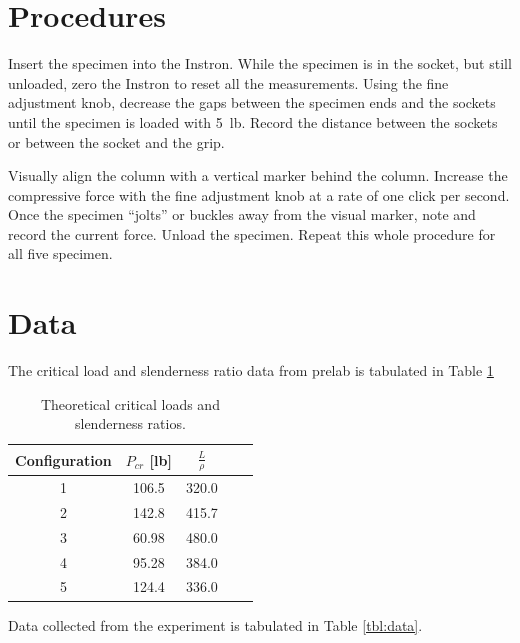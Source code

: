 \documentclass[12 pt]{article}
\begin{document}
\section{Procedures} \label{procedures}
Insert the specimen into the Instron. While the specimen is in the socket, but still unloaded, zero the Instron to reset all the measurements. Using the fine adjustment knob, decrease the gaps between the specimen ends and the sockets until the specimen is loaded with \qty{5}{lb}. Record the distance between the sockets or between the socket and the grip.

Visually align the column with a vertical marker behind the column. Increase the compressive force with the fine adjustment knob at a rate of one click per second. Once the specimen ``jolts'' or buckles away from the visual marker, note and record the current force. Unload the specimen. Repeat this whole procedure for all five specimen.

\section{Data} \label{data}
The critical load and slenderness ratio data from prelab is tabulated in Table \ref{tbl:prelab}

\begin{table}[!htbp]
\caption{Theoretical critical loads and slenderness ratios.}
\begin{center}
	\begin{tabular}{|c|c|c|c|c|}
		\hline
		Configuration&$P_{cr}$ [\unit{lb}]&$\frac{L}{\rho}$\\
		\hline
		\num{1}&\num{106.5}&\num{320.0}\\
		\hline
		\num{2}&\num{142.8}&\num{415.7}\\
		\hline
		\num{3}&\num{60.98}&\num{480.0}\\
		\hline
		\num{4}&\num{95.28}&\num{384.0}\\
		\hline
		\num{5}&\num{124.4}&\num{336.0}\\
		\hline
	\end{tabular}
\end{center}
\label{tbl:prelab}
\end{table}

Data collected from the experiment is tabulated in Table \ref{tbl:data}.
\end{document}
